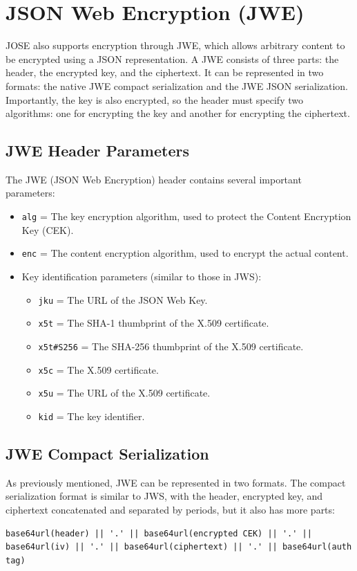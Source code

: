 \section{JSON Web Encryption (JWE)}
JOSE also supports encryption through JWE, which allows arbitrary
content to be encrypted using a JSON representation. A JWE consists of
three parts: the header, the encrypted key, and the ciphertext. It can
be represented in two formats: the native JWE compact serialization
and the JWE JSON serialization. Importantly, the key is also
encrypted, so the header must specify two algorithms: one for
encrypting the key and another for encrypting the ciphertext.

\subsection{JWE Header Parameters}

The JWE (JSON Web Encryption) header contains several important
parameters:

\begin{itemize}
    \item \texttt{alg} = The key encryption algorithm, used to protect
      the Content Encryption Key (CEK).
    \item \texttt{enc} = The content encryption algorithm, used to
      encrypt the actual content.
    \item Key identification parameters (similar to those in JWS):
    \begin{itemize}
        \item \texttt{jku} = The URL of the JSON Web Key.
        \item \texttt{x5t} = The SHA-1 thumbprint of the X.509
          certificate.
        \item \texttt{x5t\#S256} = The SHA-256 thumbprint of the X.509
          certificate.
        \item \texttt{x5c} = The X.509 certificate.
        \item \texttt{x5u} = The URL of the X.509 certificate.
        \item \texttt{kid} = The key identifier.
    \end{itemize}
\end{itemize}

\subsection{JWE Compact Serialization}
As previously mentioned, JWE can be represented in two formats. The 
compact serialization format is similar to JWS, with the header, 
encrypted key, and ciphertext concatenated and separated by periods,
but it also has more parts:
\begin{verbatim}
base64url(header) || '.' || base64url(encrypted CEK) || '.' ||
base64url(iv) || '.' || base64url(ciphertext) || '.' || base64url(auth
tag)
\end{verbatim}


